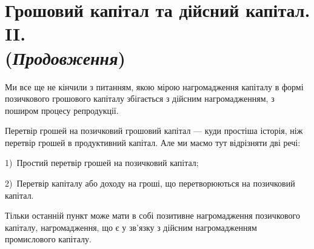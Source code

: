 \section[Грошовий капітал та дійсний капітал. II. (Продовження)]{Грошовий капітал та дійсний капітал. II. \\ (\emph{Продовження})}

Ми все ще не кінчили з питанням, якою мірою нагромадження капіталу в
формі позичкового грошового капіталу збігається з дійсним нагромадженням,
з поширом процесу репродукції.

Перетвір грошей на позичковий грошовий капітал — куди простіша історія,
ніж перетвір грошей в продуктивний капітал. Але ми маємо тут відрізняти дві
речі:

1)~Простий перетвір грошей на позичковий капітал;

2)~Перетвір капіталу або доходу на гроші, що перетворюються на позичковий
капітал.

Тільки останній пункт може мати в собі позитивне нагромадження позичкового
капіталу, нагромадження, що є у зв’язку з дійсним нагромадженням
промислового капіталу.
